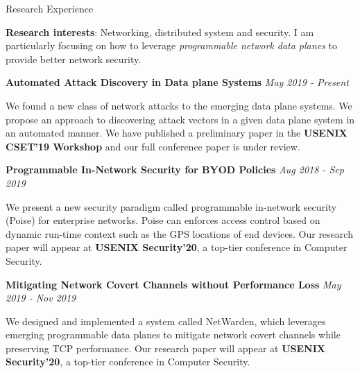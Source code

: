\documentclass{resume} %
\begin{document}
\begin{rSection}{Research Experience}

{\bf Research interests}: Networking, distributed system and security.
I am particularly focusing on how to leverage {\em programmable network data planes} to provide
better network security.

\item {\bf Automated Attack Discovery in Data plane Systems}    \hfill {\em May 2019 - Present}

We found a new class of network attacks to the emerging data plane systems.
We propose an approach to discovering attack vectors in a given data plane system in an automated manner.
We have published a preliminary paper in the {\bf USENIX CSET'19 Workshop}
and our full conference paper is under review.

\item {\bf Programmable In-Network Security for BYOD Policies} \hfill {\em Aug 2018 - Sep 2019}

We present a new security paradigm called programmable in-network security (Poise) for enterprise networks.
Poise can enforces access control based on dynamic run-time context
such as the GPS locations of end devices.
Our research paper will appear at {\bf USENIX Security'20}, a top-tier conference in Computer Security.

\item {\bf Mitigating Network Covert Channels without Performance Loss} \hfill {\em May 2019 - Nov 2019}

We designed and implemented a system called NetWarden,
which leverages emerging programmable data planes to mitigate network covert channels
while preserving TCP performance.
Our research paper will appear at {\bf USENIX Security'20}, a top-tier conference in Computer Security.

\end{rSection}


\end{document}
